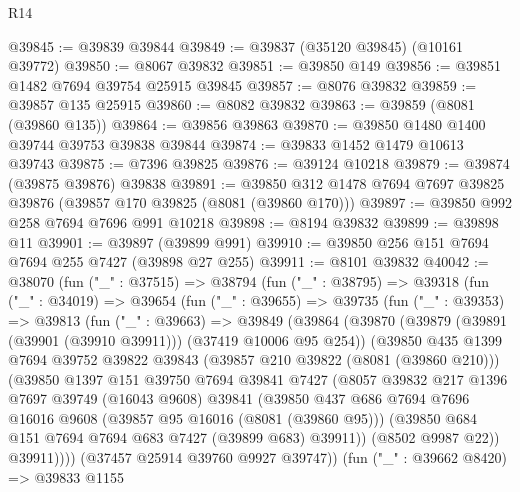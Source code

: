 \begin{lexlean}{R14}
\begin{coremodule}
@39845 := @39839 @39844
@39849 := @39837 (@35120 @39845) (@10161 @39772)
@39850 := @8067 @39832
@39851 := @39850 @149
@39856 := @39851 @1482 @7694 @39754 @25915 @39845
@39857 := @8076 @39832
@39859 := @39857 @135 @25915
@39860 := @8082 @39832
@39863 := @39859 (@8081 (@39860 @135))
@39864 := @39856 @39863
@39870 := @39850 @1480 @1400 @39744 @39753 @39838 @39844
@39874 := @39833 @1452 @1479 @10613 @39743
@39875 := @7396 @39825
@39876 := @39124 @10218
@39879 := @39874 (@39875 @39876) @39838
@39891 := @39850 @312 @1478 @7694 @7697 @39825 @39876 (@39857 @170 @39825 (@8081 (@39860 @170)))
@39897 := @39850 @992 @258 @7694 @7696 @991 @10218
@39898 := @8194 @39832
@39899 := @39898 @11
@39901 := @39897 (@39899 @991)
@39910 := @39850 @256 @151 @7694 @7694 @255 @7427 (@39898 @27 @255)
@39911 := @8101 @39832
@40042 := @38070
    (fun ("_" : @37515) =>
    @38794
      (fun ("_" : @38795) =>
      @39318
        (fun ("_" : @34019) =>
        @39654
          (fun ("_" : @39655) =>
          @39735
            (fun ("_" : @39353) =>
            @39813
              (fun ("_" : @39663) =>
              @39849
                (@39864
                  (@39870
                    (@39879 (@39891 (@39901 (@39910 @39911))) (@37419 @10006 @95 @254))
                    (@39850
                      @435
                      @1399
                      @7694
                      @39752
                      @39822
                      @39843
                      (@39857 @210 @39822 (@8081 (@39860 @210)))
                      (@39850
                        @1397
                        @151
                        @39750
                        @7694
                        @39841
                        @7427
                        (@8057
                          @39832
                          @217
                          @1396
                          @7697
                          @39749
                          (@16043 @9608)
                          @39841
                          (@39850
                            @437
                            @686
                            @7694
                            @7696
                            @16016
                            @9608
                            (@39857 @95 @16016 (@8081 (@39860 @95)))
                            (@39850 @684 @151 @7694 @7694 @683 @7427 (@39899 @683) @39911))
                          (@8502 @9987 @22))
                        @39911))))
                (@37457 @25914 @39760 @9927 @39747))
              (fun ("_" : @39662 @8420) =>
              @39833
                @1155

\end{coremodule}
\end{lexlean}
